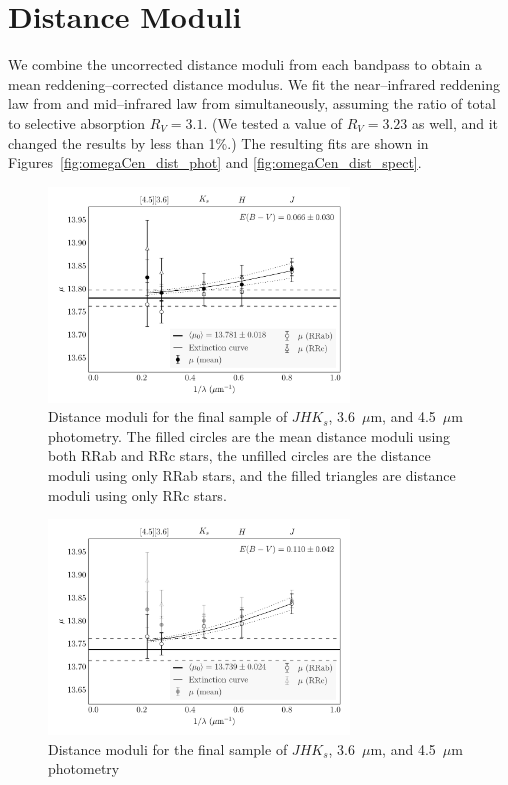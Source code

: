\documentclass[a4paper,fleqn,usenatbib]{mnras}
\begin{document}
\section{Distance Moduli}
\label{sec:distance_moduli}

We combine the uncorrected distance moduli from each bandpass to obtain a mean reddening--corrected distance modulus. We fit the near--infrared reddening law from \citet{1989ApJ...345..245C} and mid--infrared law from \citet{2005ApJ...619..931I} simultaneously, assuming the ratio of total to selective absorption $R_V = 3.1$. (We tested a value of $R_V = 3.23$ as well, and it changed the results by less than 1\%.) The resulting fits are shown in Figures~\ref{fig:omegaCen_dist_phot} and \ref{fig:omegaCen_dist_spect}.


\begin{figure}
\begin{center}
\includegraphics[width=80mm]{reworked_fitting_code/final_plots/multiwavelength_distance_m4_clipped_mean.pdf}
\caption{Distance moduli for the final sample of $J\!H\!K_s$, 3.6~$\mu$m, and 4.5~$\mu$m photometry. The filled circles are the mean distance moduli using both RRab and RRc stars, the unfilled circles are the distance moduli using only RRab stars, and the filled triangles are distance moduli using only RRc stars.}
\label{fig:omegaCen_dist_m4_mean}
\end{center}
\end{figure}

\begin{figure}
\begin{center}
\includegraphics[width=80mm]{reworked_fitting_code/final_plots/multiwavelength_distance_m4_clipped_ab.pdf}
\caption{Distance moduli for the final sample of $J\!H\!K_s$, 3.6~$\mu$m, and 4.5~$\mu$m photometry}
\label{fig:omegaCen_dist_m4_ab}
\end{center}
\end{figure}
\end{document}
